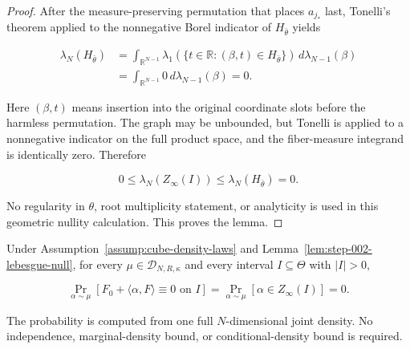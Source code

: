 \begin{proof}
After the measure-preserving permutation that places \(a_{j_*}\) last, Tonelli's theorem applied to the
nonnegative Borel indicator of \(H_{\bar\theta}\) yields

\begin{equation}
\label{eq:appendix-display-047}
\begin{aligned}
\lambda_N(H_{\bar\theta})
&=\int_{\mathbb R^{N-1}}
\lambda_1\!\left(
\{t\in\mathbb R:(\beta,t)\in H_{\bar\theta}\}
\right)\,d\lambda_{N-1}(\beta)\\
&=\int_{\mathbb R^{N-1}}0\,d\lambda_{N-1}(\beta)
=0.
\end{aligned}
\end{equation}

Here \((\beta,t)\) means insertion into the original coordinate slots before the harmless permutation. The
graph may be unbounded, but Tonelli is applied to a nonnegative indicator on the full product space, and the
fiber-measure integrand is identically zero. Therefore

\begin{equation}
\label{eq:appendix-display-048}
0\leq\lambda_N(Z_\infty(I))
\leq\lambda_N(H_{\bar\theta})
=0.
\end{equation}

No regularity in \(\theta\), root multiplicity statement, or analyticity is used in this geometric nullity
calculation. This proves the lemma. 
\end{proof}

\begin{proposition}
\label{prop:step-002-law-null}

Under Assumption~\ref{assump:cube-density-laws} and
Lemma~\ref{lem:step-002-lebesgue-null}, for every
\(\mu\in\mathcal D_{N,R,\kappa}\) and every interval \(I\subseteq\Theta\) with
\(\lvert I\rvert>0\),

\begin{equation}
\label{eq:appendix-display-049}
\Pr_{\alpha\sim\mu}
\left[
F_0+\langle\alpha,F\rangle\equiv0\text{ on }I
\right]
=\Pr_{\alpha\sim\mu}[\alpha\in Z_\infty(I)]
=0.
\end{equation}

The probability is computed from one full \(N\)-dimensional joint density. No independence, marginal-density
bound, or conditional-density bound is required.


\end{proposition}


